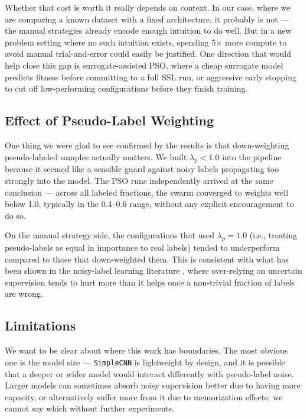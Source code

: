 \documentclass[journal]{IEEEtran}
\begin{document}
Whether that cost is worth it really depends on context. In our case, where
we are comparing a known dataset with a fixed architecture, it probably is
not --- the manual strategies already encode enough intuition to do well.
But in a new problem setting where no such intuition exists, spending 5$\times$
more compute to avoid manual trial-and-error could easily be justified. One
direction that would help close this gap is surrogate-assisted PSO, where a
cheap surrogate model predicts fitness before committing to a full SSL run,
or aggressive early stopping to cut off low-performing configurations before
they finish training.

\subsection{Effect of Pseudo-Label Weighting}

One thing we were glad to see confirmed by the results is that down-weighting
pseudo-labeled samples actually matters. We built $\lambda_p < 1.0$ into the
pipeline because it seemed like a sensible guard against noisy labels
propagating too strongly into the model. The PSO runs independently arrived
at the same conclusion --- across all labeled fractions, the swarm converged
to weights well below 1.0, typically in the 0.4--0.6 range, without any
explicit encouragement to do so.

On the manual strategy side, the configurations that used $\lambda_p = 1.0$
(i.e., treating pseudo-labels as equal in importance to real labels) tended to
underperform compared to those that down-weighted them. This is consistent
with what has been shown in the noisy-label learning literature
\cite{natarajan2013noisy}, where over-relying on uncertain supervision tends
to hurt more than it helps once a non-trivial fraction of labels are wrong.

\subsection{Limitations}

We want to be clear about where this work has boundaries. The most obvious one
is the model size --- \texttt{SimpleCNN} is lightweight by design, and it is
possible that a deeper or wider model would interact differently with
pseudo-label noise. Larger models can sometimes absorb noisy supervision
better due to having more capacity, or alternatively suffer more from it due
to memorization effects; we cannot say which without further experiments.
\end{document}
